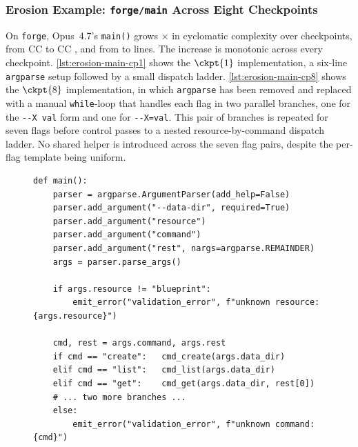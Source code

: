 \subsubsection{Erosion Example: \texttt{forge/main} Across Eight Checkpoints}\label{sec:appendix-erosion-example}

On \texttt{forge}, Opus~4.7's \texttt{main()} grows \erosionForgeMainCcMultiplier$\times$ in cyclomatic complexity over \erosionForgeNumCkpts{} checkpoints, from CC \erosionForgeMainCcFirst{} to CC \erosionForgeMainCcLast{}, and from \erosionForgeMainLinesFirst{} to \erosionForgeMainLinesLast{} lines. The increase is monotonic across every checkpoint. \autoref{lst:erosion-main-cp1} shows the $\ckpt{1}$ implementation, a six-line \texttt{argparse} setup followed by a small dispatch ladder. \autoref{lst:erosion-main-cp8} shows the $\ckpt{8}$ implementation, in which \texttt{argparse} has been removed and replaced with a manual \texttt{while}-loop that handles each flag in two parallel branches, one for the \verb|--X val| form and one for \verb|--X=val|. This pair of branches is repeated for seven flags before control passes to a nested resource-by-command dispatch ladder. No shared helper is introduced across the seven flag pairs, despite the per-flag template being uniform.

\begin{figure}[h]
\begin{lstlisting}[caption={\texttt{main()} from Opus~4.7's \texttt{forge} solution at $\ckpt{1}$. Argument parsing is delegated to \texttt{argparse}; dispatch is a single \texttt{if/elif} ladder.},label={lst:erosion-main-cp1}]
def main():
    parser = argparse.ArgumentParser(add_help=False)
    parser.add_argument("--data-dir", required=True)
    parser.add_argument("resource")
    parser.add_argument("command")
    parser.add_argument("rest", nargs=argparse.REMAINDER)
    args = parser.parse_args()

    if args.resource != "blueprint":
        emit_error("validation_error", f"unknown resource: {args.resource}")

    cmd, rest = args.command, args.rest
    if cmd == "create":   cmd_create(args.data_dir)
    elif cmd == "list":   cmd_list(args.data_dir)
    elif cmd == "get":    cmd_get(args.data_dir, rest[0])
    # ... two more branches ...
    else:
        emit_error("validation_error", f"unknown command: {cmd}")
\end{lstlisting}
\end{figure}

